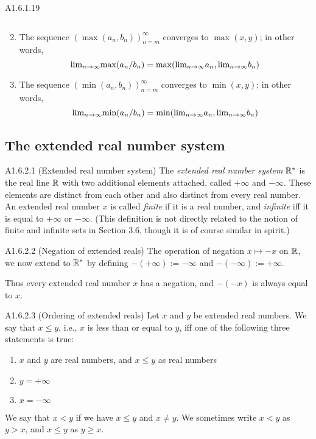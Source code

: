 \begin{theorem}{A1.6.1.19}
\begin{enumerate}
\begin{equation*}
        \end{equation*}
        \item The sequence $(\max(a_n, b_n))_{n=m}^{\infty}$ converges to $\max(x,y)$;
        in other words,
        \begin{equation*}
            \text{lim}_{n \rightarrow \infty}{\max(a_n / b_n)} = \max(\text{lim}_{n \rightarrow \infty}{a_n}, \text{lim}_{n \rightarrow \infty}{b_n})
        \end{equation*}
        \item The sequence $(\min(a_n, b_n))_{n=m}^{\infty}$ converges to $\min(x,y)$;
        in other words,
        \begin{equation*}
            \text{lim}_{n \rightarrow \infty}{\min(a_n / b_n)} = \min(\text{lim}_{n \rightarrow \infty}{a_n}, \text{lim}_{n \rightarrow \infty}{b_n})
        \end{equation*}
    \end{enumerate}
\end{theorem}

\subsection{The extended real number system}
\begin{definition}{A1.6.2.1}
    (Extended real number system) The \emph{extended real number system} $\mathbb{R}^*$
    is the real line $\mathbb{R}$ with two additional elements attached, called
    $+\infty$ and $-\infty$. These elements are distinct from each other and also
    distinct from every real number. An extended real number $x$ is called \emph{finite}
    if it is a real number, and \emph{infinite} iff it is equal to $+\infty$ or
    $-\infty$. (This definition is not directly related to the notion of finite
    and infinite sets in Section 3.6, though it is of course similar in spirit.)
\end{definition}

\begin{definition}{A1.6.2.2}
    (Negation of extended reals) The operation of negation $x \mapsto -x$ on $\mathbb{R}$,
    we now extend to $\mathbb{R}^*$ by defining $-(+\infty) := -\infty$ and
    $-(-\infty) := +\infty$.

    Thus every extended real number $x$ has a negation, and $-(-x)$ is always equal
    to $x$.
\end{definition}

\begin{definition}{A1.6.2.3}
    (Ordering of extended reals) Let $x$ and $y$ be extended real numbers. We say
    that $x \leq y$, i.e., $x$ is less than or equal to $y$, iff one of the following
    three statements is true:
    \begin{enumerate}
        \item $x$ and $y$ are real numbers, and $x \leq y$ as real numbers
        \item $y = +\infty$
        \item $x = -\infty$
    \end{enumerate}
    We say that $x < y$ if we have $x \leq y$ and $x \neq y$. We sometimes write
    $x < y$ as $y > x$, and $x \leq y$ as $y \geq x$.
\end{definition}


